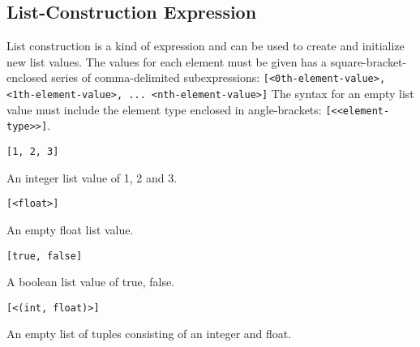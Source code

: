 
\subsection{List-Construction Expression}
{
	List construction is a kind of expression and can be
	used to create and initialize new list values.
	The values for each element must be given has a square-bracket-enclosed
	series of comma-delimited
	subexpressions: \texttt{[<0th-element-value>, <1th-element-value>, ... <nth-element-value>]}
	The syntax for an empty list value must include the element type enclosed
	in angle-brackets: \texttt{[<<element-type>>]}.
	
	\begin{itemize}
	{
		\item[] \lstinline[language=MAIA, columns=fixed]@[1, 2, 3]@
		
			An integer list value of 1, 2 and 3.
		
		\item[] \lstinline[language=MAIA, columns=fixed]@[<float>]@
		
			An empty float list value.
		
		\item[] \lstinline[language=MAIA, columns=fixed]@[true, false]@
		
			A boolean list value of true, false.
		
		\item[] \lstinline[language=MAIA, columns=fixed]@[<(int, float)>]@
		
			An empty list of tuples consisting of an integer and float.
	}
	\end{itemize}
}
